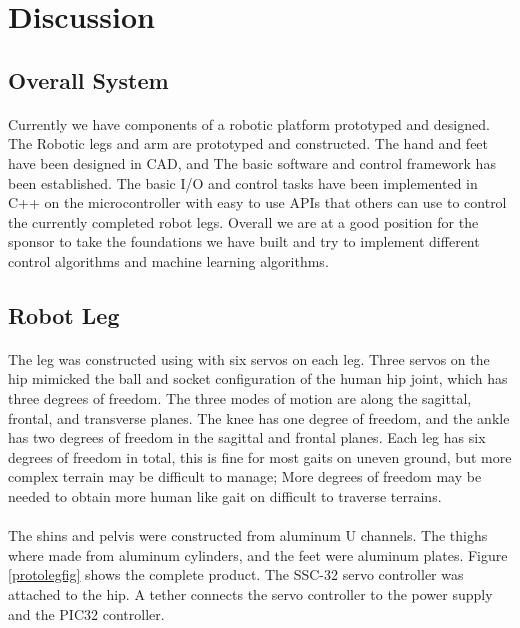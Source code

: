 \documentclass[titlepage,letterpaper,12pt]{article}
\begin{document}
\section{Discussion}
\subsection{Overall System}
\paragraph{}Currently we have components of a robotic platform prototyped and
designed. The Robotic legs and arm are prototyped and constructed. The hand and
feet have been designed in CAD, and The basic software and control framework has
been established. The basic I/O and control tasks have been implemented in C++
on the microcontroller with easy to use APIs that others can use to control the
currently completed robot legs. Overall we are at a good position for the
sponsor to take the foundations we have built and try to implement different
control algorithms and machine learning algorithms. 

\subsection{Robot Leg}
\paragraph{}The leg was constructed using with six servos on each leg. Three
servos on the hip mimicked the ball and socket configuration of the human hip
joint, which has three degrees of freedom\cite{SiasJr1990}. The three modes of
motion are along the sagittal, frontal, and transverse planes\cite{Fiscell2005}.
The knee has one degree of freedom, and the ankle has two degrees of freedom in
the sagittal and frontal planes. Each leg has six degrees of freedom in total,
this is fine for most gaits on uneven ground, but more complex terrain may be 
difficult to manage; More degrees of freedom may be needed to obtain more human
like gait on difficult to traverse terrains\cite{SiasJr1990}.

\paragraph{}The shins and pelvis were constructed from aluminum U channels. The
thighs where made from aluminum cylinders, and the feet were aluminum plates.
Figure \ref{protolegfig} shows the complete product. The SSC-32 servo controller
was attached to the hip. A tether connects the servo controller to the power
supply and the PIC32 controller. 
\end{document}
